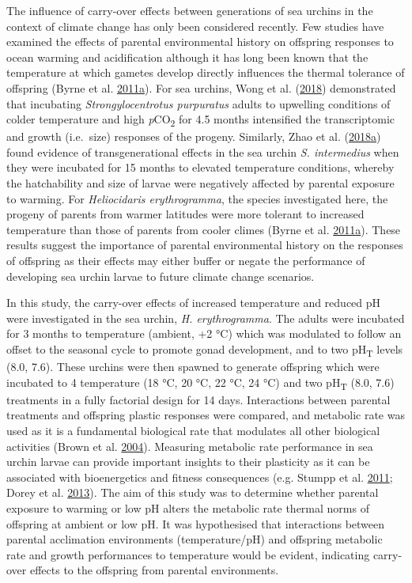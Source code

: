 \documentclass[a4paper,10pt, oneside]{memoir}
\begin{document}
The influence of carry-over effects between generations of sea urchins in the context of climate change has only been considered recently.
Few studies have examined the effects of parental environmental history on offspring responses to ocean warming and acidification although it has long been known that the temperature at which gametes develop directly influences the thermal tolerance of offspring (Byrne et al. \protect\hyperlink{ref-Byrne2011}{2011}\protect\hyperlink{ref-Byrne2011}{a}).
For sea urchins, Wong et al. (\protect\hyperlink{ref-Wong2018}{2018}) demonstrated that incubating \emph{Strongylocentrotus purpuratus} adults to upwelling conditions of colder temperature and high \emph{p}CO\textsubscript{2} for 4.5 months intensified the transcriptomic and growth (i.e.~size) responses of the progeny.
Similarly, Zhao et al. (\protect\hyperlink{ref-Zhao2018}{2018}\protect\hyperlink{ref-Zhao2018}{a}) found evidence of transgenerational effects in the sea urchin \emph{S. intermedius} when they were incubated for 15 months to elevated temperature conditions, whereby the hatchability and size of larvae were negatively affected by parental exposure to warming.
For \emph{Heliocidaris erythrogramma}, the species investigated here, the progeny of parents from warmer latitudes were more tolerant to increased temperature than those of parents from cooler climes (Byrne et al. \protect\hyperlink{ref-Byrne2011}{2011}\protect\hyperlink{ref-Byrne2011}{a}).
These results suggest the importance of parental environmental history on the responses of offspring as their effects may either buffer or negate the performance of developing sea urchin larvae to future climate change scenarios.

In this study, the carry-over effects of increased temperature and reduced pH were investigated in the sea urchin, \emph{H. erythrogramma}.
The adults were incubated for 3 months to temperature (ambient, +2 °C) which was modulated to follow an offset to the seasonal cycle to promote gonad development, and to two pH\textsubscript{T} levels (8.0, 7.6).
These urchins were then spawned to generate offspring which were incubated to 4 temperature (18 °C, 20 °C, 22 °C, 24 °C) and two pH\textsubscript{T} (8.0, 7.6) treatments in a fully factorial design for 14 days.
Interactions between parental treatments and offspring plastic responses were compared, and metabolic rate was used as it is a fundamental biological rate that modulates all other biological activities (Brown et al. \protect\hyperlink{ref-Brown2004}{2004}).
Measuring metabolic rate performance in sea urchin larvae can provide important insights to their plasticity as it can be associated with bioenergetics and fitness consequences (e.g. Stumpp et al. \protect\hyperlink{ref-Stumpp2011}{2011}; Dorey et al. \protect\hyperlink{ref-Dorey2013}{2013}).
The aim of this study was to determine whether parental exposure to warming or low pH alters the metabolic rate thermal norms of offspring at ambient or low pH.
It was hypothesised that interactions between parental acclimation environments (temperature/pH) and offspring metabolic rate and growth performances to temperature would be evident, indicating carry-over effects to the offspring from parental environments.
\end{document}
